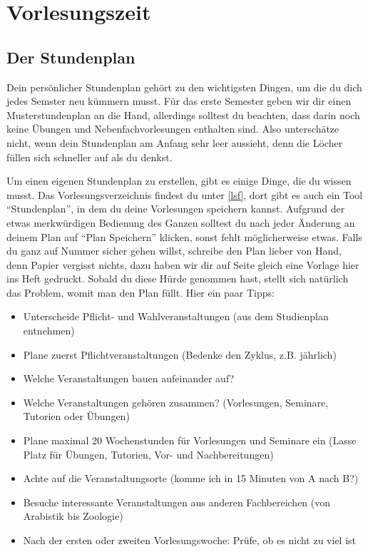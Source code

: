 ﻿\chapter{Vorlesungszeit}

\section{Der Stundenplan}

Dein persönlicher Stundenplan gehört zu den wichtigsten Dingen, um die du dich jedes Semster neu kümmern musst.
Für das erste Semester geben wir dir einen Musterstundenplan an die Hand, allerdings solltest du beachten, dass darin noch keine Übungen und Nebenfachvorlesungen enthalten sind. Also unterschätze nicht, wenn dein Stundenplan am Anfang sehr leer aussieht, denn die Löcher füllen sich schneller auf als du denkst.

Um einen eigenen Stundenplan zu erstellen, gibt es einige Dinge, die du wissen
musst. Das Vorlesungsverzeichnis findest du unter \ref{lsf}, dort gibt es auch
ein Tool ``Stundenplan'', in dem du deine Vorlesungen speichern kannst.
Aufgrund der etwas merkwürdigen Bedienung des Ganzen solltest du nach jeder
Änderung an deinem Plan auf ``Plan Speichern'' klicken, sonst fehlt
möglicherweise etwas. Falls du ganz auf Nummer sicher gehen willst, schreibe den
Plan lieber von Hand, denn Papier vergisst nichts, dazu haben wir dir auf Seite
\pageref{studenplan} gleich eine Vorlage hier ins Heft gedruckt. Sobald du
diese Hürde genommen hast, stellt sich natürlich das Problem, womit man den
Plan füllt. Hier ein paar Tipps:

\begin{itemize}
	\item Unterscheide Pflicht- und Wahlveranstaltungen (aus dem Studienplan entnehmen)
	\item Plane zuerst Pflichtveranstaltungen (Bedenke den Zyklus, z.B. jährlich)
	\item Welche Veranstaltungen bauen aufeinander auf?
	\item Welche Veranstaltungen gehören zusammen? (Vorlesungen, Seminare, Tutorien oder Übungen)
	\item Plane maximal 20 Wochenstunden für Vorlesungen und Seminare ein (Lasse Platz für Übungen, Tutorien, Vor- und Nachbereitungen)
	\item Achte auf die Veranstaltungsorte (komme ich in 15 Minuten von A nach B?)
	\item Besuche interessante Veranstaltungen aus anderen Fachbereichen (von Arabistik bis Zoologie)
	\item Nach der ersten oder zweiten Vorlesungswoche: Prüfe, ob es nicht zu viel ist
\end{itemize}

